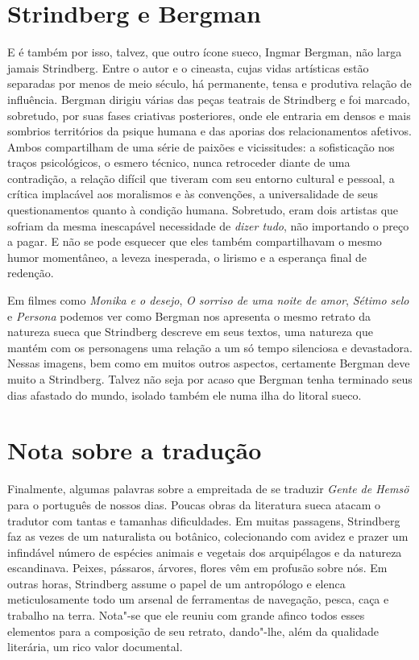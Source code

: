 \section{Strindberg e Bergman}

E é também por isso, talvez, que outro ícone sueco, Ingmar Bergman, não
larga jamais Strindberg. Entre o autor e o cineasta, cujas vidas
artísticas estão separadas por menos de meio século, há permanente,
tensa e produtiva relação de influência. Bergman dirigiu várias das
peças teatrais de Strindberg e foi marcado, sobretudo, por suas fases
criativas posteriores, onde ele entraria em densos e mais sombrios
territórios da psique humana e das aporias dos relacionamentos
afetivos. Ambos compartilham de uma série de paixões e vicissitudes: a
sofisticação nos traços psicológicos, o esmero técnico, nunca
retroceder diante de uma contradição, a relação difícil que tiveram com
seu entorno cultural e pessoal, a crítica implacável aos moralismos e
às convenções, a universalidade de seus questionamentos quanto à
condição humana. Sobretudo, eram dois artistas que sofriam da mesma
inescapável necessidade de \textit{dizer tudo}, não importando o preço
a pagar. E não se pode esquecer que eles também compartilhavam
o mesmo humor momentâneo, a leveza inesperada, o lirismo e a esperança
final de redenção. 

Em filmes como \textit{Monika e o desejo}, \textit{O sorriso de
uma noite de amor}, \textit{Sétimo selo} e \textit{Persona} podemos ver
como Bergman nos apresenta o mesmo retrato da natureza sueca que
Strindberg descreve em seus textos, uma natureza que mantém com os
personagens uma relação a um só tempo silenciosa e devastadora. Nessas
imagens, bem como em muitos outros aspectos, certamente Bergman deve
muito a Strindberg.  Talvez não seja por acaso que Bergman tenha
terminado seus dias afastado do mundo, isolado também ele numa ilha do
litoral sueco. 

\section{Nota sobre a tradução}

Finalmente, algumas palavras sobre a empreitada de se traduzir 
\textit{Gente de Hemsö} para o português de nossos dias. Poucas obras da literatura
sueca atacam o tradutor com tantas e tamanhas dificuldades. Em muitas passagens,
Strindberg faz as vezes de um naturalista ou botânico, colecionando com
avidez e prazer um infindável número de espécies animais e vegetais dos
arquipélagos e da natureza escandinava. Peixes, pássaros, árvores,
flores vêm em profusão sobre nós. Em outras horas, Strindberg assume o
papel de um antropólogo e elenca meticulosamente todo um arsenal de
ferramentas de navegação, pesca, caça e trabalho na terra. Nota"-se que
ele reuniu com grande afinco todos esses elementos para a composição de
seu retrato, dando"-lhe, além da qualidade literária, um rico valor documental.

